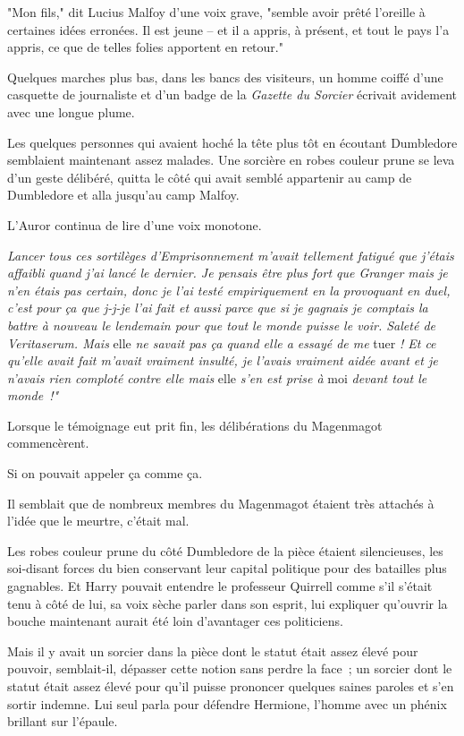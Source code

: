 "Mon fils," dit Lucius Malfoy d'une voix grave, "semble avoir prêté l'oreille à certaines idées erronées. Il est jeune -- et il a appris, à présent, et tout le pays l'a appris, ce que de telles folies apportent en retour."

Quelques marches plus bas, dans les bancs des visiteurs, un homme coiffé d'une casquette de journaliste et d'un badge de la \emph{Gazette du Sorcier} écrivait avidement avec une longue plume.

Les quelques personnes qui avaient hoché la tête plus tôt en écoutant Dumbledore semblaient maintenant assez malades. Une sorcière en robes couleur prune se leva d'un geste délibéré, quitta le côté qui avait semblé appartenir au camp de Dumbledore et alla jusqu'au camp Malfoy.

L'Auror continua de lire d'une voix monotone.

\emph{Lancer tous ces sortilèges d'Emprisonnement m'avait tellement fatigué que j'étais affaibli quand j'ai lancé le dernier. Je pensais être plus fort que Granger mais je n'en étais pas certain, donc je l'ai testé empiriquement en la provoquant en duel, c'est pour ça que j-j-je l'ai fait et aussi parce que si je gagnais je comptais la battre à nouveau le lendemain pour que tout le monde puisse le voir. Saleté de Veritaserum. Mais} elle \emph{ne savait pas ça quand elle a essayé de me} tuer \emph{! Et ce qu'elle avait fait m'avait vraiment insulté, je l'avais vraiment aidée avant et je n'avais rien comploté contre elle mais} elle \emph{s'en est prise à} moi \emph{devant tout le monde~!"}

Lorsque le témoignage eut prit fin, les délibérations du Magenmagot commencèrent.

Si on pouvait appeler ça comme ça.

Il semblait que de nombreux membres du Magenmagot étaient très attachés à l'idée que le meurtre, c'était mal.

Les robes couleur prune du côté Dumbledore de la pièce étaient silencieuses, les soi-disant forces du bien conservant leur capital politique pour des batailles plus gagnables. Et Harry pouvait entendre le professeur Quirrell comme s'il s'était tenu à côté de lui, sa voix sèche parler dans son esprit, lui expliquer qu'ouvrir la bouche maintenant aurait été loin d'avantager ces politiciens.

Mais il y avait un sorcier dans la pièce dont le statut était assez élevé pour pouvoir, semblait-il, dépasser cette notion sans perdre la face~; un sorcier dont le statut était assez élevé pour qu'il puisse prononcer quelques saines paroles et s'en sortir indemne. Lui seul parla pour défendre Hermione, l'homme avec un phénix brillant sur l'épaule.

